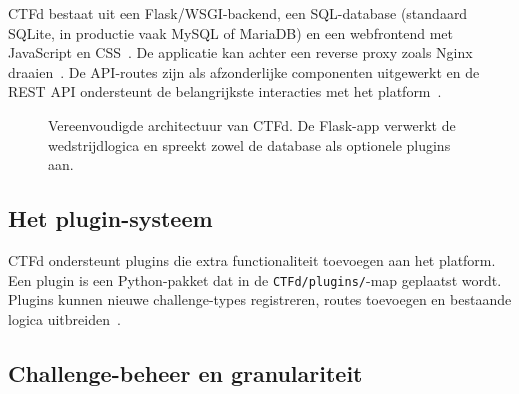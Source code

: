 CTFd bestaat uit een Flask/WSGI-backend, een SQL-database (standaard SQLite, in productie vaak MySQL of MariaDB) en een webfrontend met JavaScript en CSS~\autocite{CTFdOverview,CTFdInstallation,CTFdContributing}. De applicatie kan achter een reverse proxy zoals Nginx draaien~\autocite{CTFdConfiguration}. De API-routes zijn als afzonderlijke componenten uitgewerkt en de REST API ondersteunt de belangrijkste interacties met het platform~\autocite{CTFdAPI,CTFdContributing}.

\begin{figure}[H]
  \centering
  \caption[Architectuur van CTFd]{Vereenvoudigde architectuur van CTFd. De Flask-app verwerkt de wedstrijdlogica en spreekt zowel de database als optionele plugins aan.}
  \label{fig:ctfd-architectuur}
\end{figure}

\subsection{Het plugin-systeem}

CTFd ondersteunt plugins die extra functionaliteit toevoegen aan het platform. Een plugin is een Python-pakket dat in de \texttt{CTFd/plugins/}-map geplaatst wordt. Plugins kunnen nieuwe challenge-types registreren, routes toevoegen en bestaande logica uitbreiden~\autocite{CTFdGitHub,CTFdPlugins}.

\subsection{Challenge-beheer en granulariteit}

